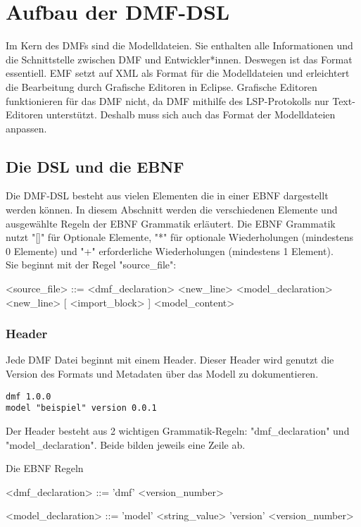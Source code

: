 \documentclass[./einleitung.tex]{subfiles}
\begin{document}
\section{Aufbau der DMF-DSL}
Im Kern des DMFs sind die Modelldateien. Sie enthalten alle Informationen und die Schnittstelle zwischen DMF und Entwickler*innen.
Deswegen ist das Format essentiell. EMF setzt auf XML als Format für die Modelldateien und erleichtert die Bearbeitung durch Grafische Editoren in Eclipse.
Grafische Editoren funktionieren für das DMF nicht, da DMF mithilfe des LSP-Protokolls nur Text-Editoren unterstützt.
Deshalb muss sich auch das Format der Modelldateien anpassen.

\subsection{Die DSL und die EBNF}
Die DMF-DSL besteht aus vielen Elementen die in einer EBNF dargestellt werden können. In diesem Abschnitt werden die verschiedenen Elemente und ausgewählte Regeln der EBNF Grammatik erläutert.\newline \newline
Die EBNF Grammatik nutzt "[]" für Optionale Elemente, "*" für optionale Wiederholungen (mindestens 0 Elemente) und "+" erforderliche Wiederholungen (mindestens 1 Element).  \\
Sie beginnt mit der Regel "source_file":
\begin{grammar}
<source_file> ::= <dmf_declaration> <new_line> <model_declaration> <new_line> [ <import_block> ] <model_content>
\end{grammar}
\subsubsection{Header}
Jede DMF Datei beginnt mit einem Header. Dieser Header wird genutzt die Version des Formats und Metadaten über das Modell zu dokumentieren.
\begin{lstlisting}[caption={Header einer DMF-Modelldatei}]
dmf 1.0.0
model "beispiel" version 0.0.1
\end{lstlisting}
Der Header besteht aus 2 wichtigen Grammatik-Regeln: "dmf_declaration" und "model_declaration". Beide bilden jeweils eine Zeile ab.
\begin{myenv}
\caption{Die EBNF Regeln}
\begin{grammar}
<dmf_declaration> ::= 'dmf' <version_number>

<model_declaration> ::= 'model' <string_value> 'version' <version_number>
\end{grammar}
\end{myenv}
\end{document}
